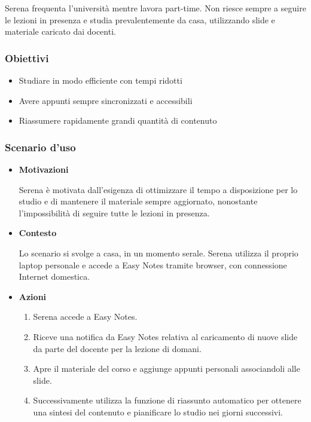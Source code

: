 Serena frequenta l'università mentre lavora part-time. Non riesce sempre a seguire le lezioni in presenza e studia prevalentemente da casa, utilizzando slide e materiale caricato dai docenti.

\subsubsection{Obiettivi}
\begin{itemize}
    \item Studiare in modo efficiente con tempi ridotti
    \item Avere appunti sempre sincronizzati e accessibili
    \item Riassumere rapidamente grandi quantità di contenuto
\end{itemize}

\subsubsection{Scenario d'uso}
\begin{itemize}
    \item \textbf{Motivazioni}\par
    Serena è motivata dall'esigenza di ottimizzare il tempo a disposizione per lo studio e di mantenere il materiale sempre aggiornato, nonostante l'impossibilità di seguire tutte le lezioni in presenza.
    \item \textbf{Contesto}\par
    Lo scenario si svolge a casa, in un momento serale. Serena utilizza il proprio laptop personale e accede a Easy Notes tramite browser, con connessione Internet domestica.
    \item \textbf{Azioni}\par
    \begin{enumerate}
        \item Serena accede a Easy Notes.
        \item Riceve una notifica da Easy Notes relativa al caricamento di nuove slide da parte del docente per la lezione di domani. 
        \item Apre il materiale del corso e aggiunge appunti personali associandoli alle slide. 
        \item Successivamente utilizza la funzione di riassunto automatico per ottenere una sintesi del contenuto e pianificare lo studio nei giorni successivi.
    \end{enumerate}
\end{itemize}


